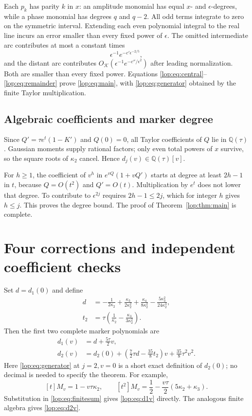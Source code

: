 \documentclass[11pt,letterpaper]{article}
\numberwithin{equation}{section}
\theoremstyle{remark}\newtheorem{remark}[theorem]{Remark}
\newcommand{\QQ}{\mathbb Q}
\begin{document}
Each $p_k$ has parity $k$ in $x$: an amplitude monomial has equal
$x$- and $\epsilon$-degrees, while a phase monomial has degrees $q$
and $q-2$. All odd terms integrate to zero on the symmetric interval.
Extending each even polynomial integral to the real line incurs an
error smaller than every fixed power of $\epsilon$. The omitted
intermediate arc contributes at most a constant times
\[
 \epsilon^{-1}e^{-c'\epsilon^{-2/5}},
\]
and the distant arc contributes
$O_{\mathcal K}(\epsilon^{-1}e^{-c''/\epsilon^2})$ after leading
normalization. Both are smaller than every fixed power. Equations
\eqref{lop:eq:central}--\eqref{lop:eq:remainder} prove \eqref{lop:eq:main}, with
\eqref{lop:eq:generator} obtained by the finite Taylor multiplication.

\subsection{Algebraic coefficients and marker degree}
Since $Q'=\tau e^t(1-K')$ and $Q(0)=0$, all Taylor coefficients of $Q$
lie in $\QQ(\tau)$. Gaussian moments supply rational factors; only even
total powers of $x$ survive, so the square roots of $\kappa_2$ cancel.
Hence $d_j(v)\in\QQ(\tau)[v]$.

For $h\geq1$, the coefficient of $v^h$ in
$e^{vQ}(1+vQ')$ starts at degree at least $2h-1$ in $t$, because
$Q=O(t^2)$ and $Q'=O(t)$. Multiplication by $e^t$ does not lower that
degree. To contribute to $\epsilon^{2j}$ requires $2h-1\leq2j$,
which for integer $h$ gives $h\leq j$. This proves the degree bound.
The proof of Theorem~\ref{lop:thm:main} is complete.

\section{Four corrections and independent coefficient checks}\label{lop:sec:corrections}

Set $d=d_1(0)$ and define
\begin{align}
 d&=-\frac1{2\kappa_2}+\frac{\kappa_3}{2\kappa_2^2}
      +\frac{\kappa_4}{8\kappa_2^2}
      -\frac{5\kappa_3^2}{24\kappa_2^3},\label{lop:eq:d1}\\
 t_2&=\tau\left(\frac1{\kappa_2}-\frac{\kappa_3}{3\kappa_2^2}\right).
 \label{lop:eq:t2}
\end{align}
Then the first two complete marker polynomials are
\begin{align}
 d_1(v)&=d+\frac{5\tau}{2}v,\label{lop:eq:d1v}\\
 d_2(v)&=d_2(0)+\left(\frac72\tau d-\frac{35}8t_2\right)v
                     +\frac{35}8\tau^2v^2.\label{lop:eq:d2v}
\end{align}
Here \eqref{lop:eq:generator} at $j=2,v=0$ is a short exact definition of
$d_2(0)$; no decimal is needed to specify the theorem. For example,
\[
 [t]M_v=1-v\tau\kappa_2,\qquad
 [t^2]M_v=\frac12-\frac{v\tau}{2}(5\kappa_2+\kappa_3).
\]
Substitution in \eqref{lop:eq:finitesum} gives \eqref{lop:eq:d1v} directly.
The analogous finite algebra gives \eqref{lop:eq:d2v}.
\end{document}
